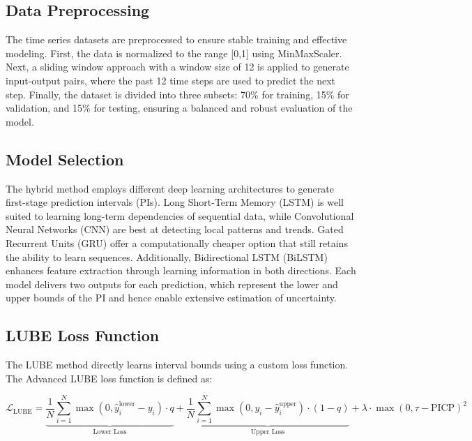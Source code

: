 \subsection{Data Preprocessing}
The time series datasets are preprocessed to ensure stable training and effective modeling. First, the data is normalized to the range [0,1] using MinMaxScaler. Next, a sliding window approach with a window size of 12 is applied to generate input-output pairs, where the past 12 time steps are used to predict the next step. Finally, the dataset is divided into three subsets: 70\% for training, 15\% for validation, and 15\% for testing, ensuring a balanced and robust evaluation of the model.

\subsection{Model Selection}
The hybrid method employs different deep learning architectures to generate first-stage prediction intervals (PIs). Long Short-Term Memory (LSTM) is well suited to learning long-term dependencies of sequential data, while Convolutional Neural Networks (CNN) are best at detecting local patterns and trends. Gated Recurrent Units (GRU) offer a computationally cheaper option that still retains the ability to learn sequences. Additionally, Bidirectional LSTM (BiLSTM) enhances feature extraction through learning information in both directions. Each model delivers two outputs for each prediction, which represent the lower and upper bounds of the PI and hence enable extensive estimation of uncertainty.

\subsection{LUBE Loss Function}
The LUBE method directly learns interval bounds using a custom loss function. The Advanced LUBE loss function is defined as:

\begin{equation}
\mathcal{L}_{\text{LUBE}} = \underbrace{\frac{1}{N} \sum_{i=1}^{N} \max(0, \hat{y}_i^{\text{lower}} - y_i) \cdot q}_{\text{Lower Loss}} 
+ \underbrace{\frac{1}{N} \sum_{i=1}^{N} \max(0, y_i - \hat{y}_i^{\text{upper}}) \cdot (1 - q)}_{\text{Upper Loss}}
+ \lambda \cdot \max(0, \tau - \text{PICP})^2
\label{Equation 5}
\end{equation}


